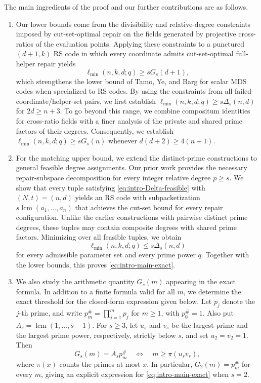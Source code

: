 \documentclass[11pt,onecolumn]{IEEEtran}
\newcommand{\lcmop}{\operatorname{lcm}}
\newcommand{\ellmin}{\ell_{\min}}
\newcommand{\primorial}[1]{p_{#1}^{\#}}
\begin{document}
The main ingredients of the proof and our further contributions are as follows.
\begin{enumerate}
\item Our lower bounds come from the divisibility and relative-degree
constraints imposed by cut-set-optimal repair on the fields generated
by projective cross-ratios of the evaluation points.  Applying these
constraints to a punctured $(d+1,k)$ RS code in which every
coordinate admits cut-set-optimal full-helper repair yields
\[
\ellmin(n,k,d;q)\ge sG_s(d+1),
\]
which strengthens the lower bound of Tamo, Ye, and Barg
\cite[Theorem~5]{TYB2017} for scalar MDS codes when specialized to RS codes.
By using the constraints from all failed-coordinate/helper-set pairs,
we first establish
$\ellmin(n,k,d;q)\ge s\Delta_s(n,d)$ for $2d\geq n+3$.
To go beyond this range, we combine compositum identities for
cross-ratio fields with a finer analysis of the private and shared
prime factors of their degrees.  Consequently, we establish
$\ellmin(n,k,d;q)\ge sG_s(n)$ whenever
$d(d+2)\geq 4(n+1)$.

\item For the matching upper bound, we extend the distinct-prime
constructions to general feasible degree assignments.
Our prior work \cite[Theorem~3]{Qiu2026} provides the necessary
repair-subspace decomposition for every integer relative degree
$p\ge s$.  We show that every tuple satisfying
\eqref{eq:intro-Delta-feasible} with $(N,t)=(n,d)$ yields an RS code
with subpacketization $s\lcmop(a_1,\ldots,a_n)$ that achieves the
cut-set bound for every repair configuration.  Unlike the earlier
constructions with pairwise distinct prime degrees, these tuples
may contain composite degrees with shared prime factors.  Minimizing over all feasible tuples, we obtain
\[
\ellmin(n,k,d;q)\le s\Delta_s(n,d)
\]
for every admissible parameter set and every prime power $q$.
Together with the lower bounds, this proves \eqref{eq:intro-main-exact}.

\item We also study the arithmetic quantity $G_s(m)$ appearing in the
exact formula. In addition to a finite formula valid for all $m$,
we determine the exact threshold for the closed-form expression given below. Let $p_j$ denote the $j$-th prime, and write
$\primorial{m}=\prod_{j=1}^{m}p_j$ for $m\ge1$, with
$\primorial{0}=1$. Also put $A_s=\lcmop(1,\ldots,s-1)$.  For $s\ge3$, let $u_s$
and $v_s$ be the largest prime and the largest prime power,
respectively, strictly below $s$, and set $u_2=v_2=1$.  Then
\[
G_s(m)=A_sp_m^{\#}
\quad\Longleftrightarrow\quad
m\ge\pi(u_sv_s),
\]
where $\pi(x)$ counts the primes at most $x$.  In particular,
$G_2(m)=p_m^{\#}$ for every $m$, giving an explicit expression for
\eqref{eq:intro-main-exact} when $s=2$.


\end{enumerate}
\end{document}
